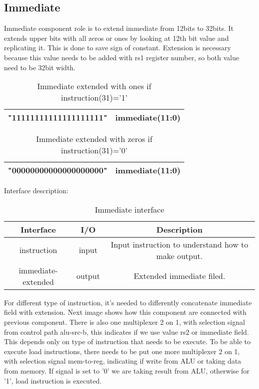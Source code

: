 \documentclass{scrreprt}
\begin{document}
\subsection*{Immediate}
Immediate component role is to extend immediate from 12bits to 32bits. It extends upper bits with all zeros or ones by looking at 12th bit value and replicating it. This is done to save sign of constant. Extension is necessary because this value needs to be added with rs1 register number, so both value need to be 32bit width.
\begin{table}[htb!]
        \centering
        \begin{tabular}{|c|c|} \hline 
             "11111111111111111111" & immediate(11:0)  \\ \hline  
        \end{tabular}
        \caption{Immediate extended with ones if instruction(31)='1'}
        \label{tab:Ones interface}
    \end{table}

\begin{table}[htb!]
        \centering
        \begin{tabular}{|c|c|} \hline 
             "00000000000000000000" & immediate(11:0)  \\ \hline  
        \end{tabular}
        \caption{Immediate extended with zeros if instruction(31)='0'}
        \label{tab:Zeros interface}
    \end{table}
    \hfill \break
Interface description:
\begin{table}[htb!]
        \centering
        \begin{tabular}{|c|c|c|} \hline 
             Interface & I/O & Description \\ \hline  
             instruction & input & Input instruction to understand how to make output.  \\ \hline  
             immediate-extended & output & Extended immediate filed.  \\ \hline
        \end{tabular}
        \caption{Immediate interface}
        \label{tab:Imm interface}
    \end{table}
    \hfill \break
    \newpage
For different type of instruction, it's needed to differently concatenate immediate field with extension.
Next image shows how this component are connected with previous component. There is also one multiplexer 2 on 1, with selection signal from control path alu-src-b, this indicates if we use value rs2 or immediate field. This depends only on type of instruction that needs to be execute. 
To be able to execute load instructions, there needs to be put one more multiplexer 2 on 1, with selection signal mem-to-reg, indicating if write from ALU or taking data from memory. If signal is set to '0' we are taking result from ALU, otherwise for '1', load instruction is executed. 
\end{document}
